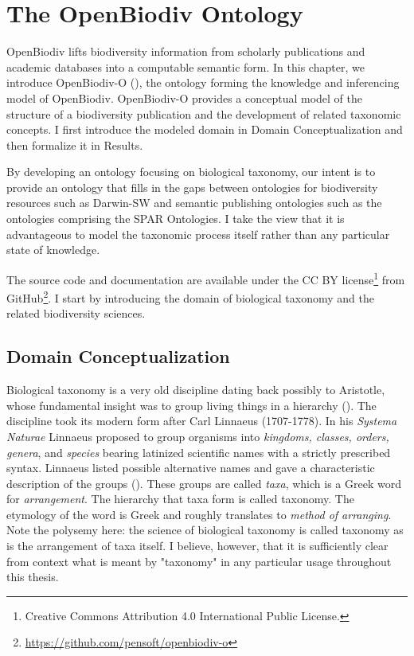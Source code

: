 \chapter{The OpenBiodiv Ontology}

\label{chapter-ontology}

OpenBiodiv lifts biodiversity information from scholarly publications and academic databases into a computable semantic form.  In this chapter, we introduce OpenBiodiv-O (\cite{senderov_openbiodiv-o:_2018}), the ontology forming the knowledge and inferencing model of OpenBiodiv. OpenBiodiv-O provides a conceptual model of the structure of a biodiversity publication and the development of related taxonomic concepts. I first introduce the modeled domain in Domain Conceptualization and then formalize it in Results. 

By developing an ontology focusing on biological taxonomy, our intent is to provide an ontology that fills in the gaps between ontologies for biodiversity resources such as Darwin-SW and semantic publishing ontologies such as the ontologies comprising the SPAR Ontologies. I take the view that it is advantageous to model the taxonomic process itself rather than any particular state of knowledge.

The source code and documentation are available under the CC BY license\footnote{Creative Commons Attribution 4.0 International Public License.} from GitHub\footnote{\href{https://github.com/pensoft/openbiodiv-o/blob/master/LICENSE.md}{https://github.com/pensoft/openbiodiv-o}}. I start by introducing the domain of biological taxonomy and the related biodiversity sciences.

\section{Domain Conceptualization}

Biological taxonomy is a very old discipline dating back possibly to Aristotle, whose fundamental insight was to group living things in a hierarchy (\cite{manktelow_history_2010}). The discipline took its modern form after Carl Linnaeus (1707-1778). In his \emph{Systema Naturae} Linnaeus proposed to group organisms into \emph{kingdoms, classes, orders, genera}, and \emph{species} bearing latinized scientific names with a strictly prescribed syntax. Linnaeus listed possible alternative names and gave a characteristic description of the groups (\cite{linnaeus_systema_1758}). These groups are called \emph{taxa}, which is a Greek word for \emph{arrangement}. The hierarchy that taxa form is called taxonomy. The etymology of the word is Greek and roughly translates to \emph{method of arranging}. Note the polysemy here: the science of biological taxonomy is called taxonomy as is the arrangement of taxa itself. I believe, however, that it is sufficiently clear from context what is meant by "taxonomy" in any particular usage throughout this thesis.

